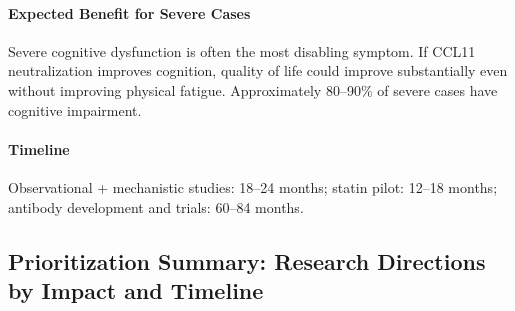 \paragraph{Expected Benefit for Severe Cases}
Severe cognitive dysfunction is often the most disabling symptom. If CCL11 neutralization improves cognition, quality of life could improve substantially even without improving physical fatigue. Approximately 80--90\% of severe cases have cognitive impairment.

\paragraph{Timeline}
Observational + mechanistic studies: 18--24 months; statin pilot: 12--18 months; antibody development and trials: 60--84 months.

\subsection{Prioritization Summary: Research Directions by Impact and Timeline}
\label{sec:research-prioritization}

